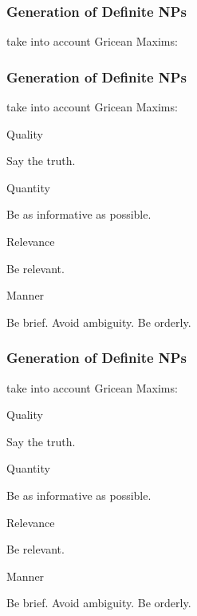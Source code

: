 \documentclass[compress,color=usenames]{beamer}
\begin{document}
\begin{frame}
\frametitle{
Generation of Deﬁnite NPs}



take into account Gricean Maxims:










\end{frame}
\begin{frame}
\frametitle{
Generation of Deﬁnite NPs}



take into account Gricean Maxims:



Quality



Say the truth.



Quantity



Be as informative as possible.



Relevance



Be relevant.



Manner



Be brief. Avoid ambiguity. Be orderly.










\end{frame}
\begin{frame}
\frametitle{
Generation of Deﬁnite NPs}



take into account Gricean Maxims:



Quality



Say the truth.



Quantity



Be as informative as possible.



Relevance



Be relevant.



Manner



Be brief. Avoid ambiguity. Be orderly.










\end{frame}
\end{document}
